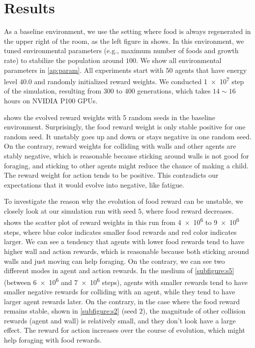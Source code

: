 \section{Results}

As a baseline environment, we use the setting where food is always regenerated in the upper right of the room, as the left figure in  shows. In this environment, we tuned environmental parameters (e.g., maximum number of foods and growth rate) to stabilize the population around $100$. We show all environmental parameters in \cref{ap:param}. All experiments start with $50$ agents that have energy level $40.0$ and randomly initialized reward weights. We conducted \num{1e7} step of the simulation, resulting from $300$ to $400$ generations, which takes $14\sim16$ hours on NVIDIA P100 GPUs.

 shows the evolved reward weights with 5 random seeds in the baseline environment. Surprisingly, the food reward weight is only stable positive for one random seed. It unstably goes up and down or stays negative in one random seed. On the contrary, reward weights for colliding with walls and other agents are stably negative, which is reasonable because sticking around walls is not good for foraging, and sticking to other agents might reduce the chance of making a child. The reward weight for action tends to be positive. This contradicts our expectations that it would evolve into negative, like fatigue.

To investigate the reason why the evolution of food reward can be unstable, we closely look at our simulation run with seed $5$, where food reward decreases.  shows the scatter plot of reward weights in this run from \num{4e6} to \num{9e6} steps, where blue color indicates smaller food rewards and red color indicates larger. We can see a tendency that agents with lower food rewards tend to have higher wall and action rewards, which is reasonable because both sticking around walls and just moving can help foraging. On the contrary, we can see two different modes in agent and action rewards. In the medium of \cref{subfigure:s5} (between \num{6e6} and \num{7e6} steps), agents with smaller rewards tend to have smaller negative rewards for colliding with an agent, while they tend to have larger agent rewards later. On the contrary, in the case where the food reward remains stable, shown in \cref{subfigure:s2} (seed $2$), the magnitude of other collision rewards (agent and wall) is relatively small, and they don't look have a large effect. The reward for action increases over the course of evolution, which might help foraging with food rewards.

